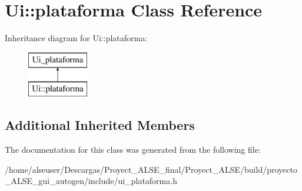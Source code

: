 \hypertarget{class_ui_1_1plataforma}{}\section{Ui\+:\+:plataforma Class Reference}
\label{class_ui_1_1plataforma}
Inheritance diagram for Ui\+:\+:plataforma\+:\begin{figure}[H]
\begin{center}
\leavevmode
\includegraphics[height=2.000000cm]{class_ui_1_1plataforma}
\end{center}
\end{figure}
\subsection*{Additional Inherited Members}


The documentation for this class was generated from the following file\+:\begin{DoxyCompactItemize}
\item 
/home/alseuser/\+Descargas/\+Proyect\+\_\+\+A\+L\+S\+E\+\_\+final/\+Proyect\+\_\+\+A\+L\+S\+E/build/proyecto\+\_\+\+A\+L\+S\+E\+\_\+gui\+\_\+autogen/include/ui\+\_\+plataforma.\+h\end{DoxyCompactItemize}
